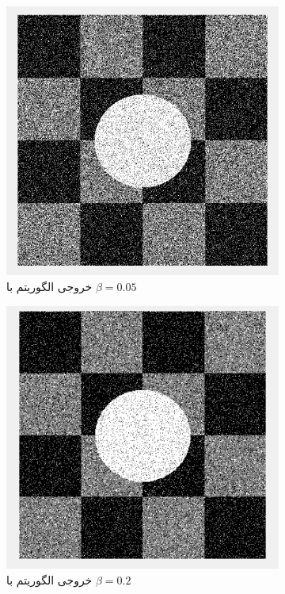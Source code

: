 \documentclass[11.5pt,a4paper]{article}
\begin{document}
\begin{figure}[h]
\begin{subfigure}{0.3\textwidth}
	\includegraphics[scale=0.3]{Imgs/MRF_S1_Beta05_Res.png}
	\caption{خروجی الگوریتم با $\beta=0.05$}
	\end{subfigure}
	\begin{subfigure}{0.3\textwidth}
	\includegraphics[scale=0.35]{Imgs/MRF_S1_Beta2_Res.png}
	\caption{خروجی الگوریتم با $\beta=0.2$}
	\end{subfigure}
	\begin{subfigure}{0.3\textwidth}

\end{subfigure}
\end{figure}
\end{document}
